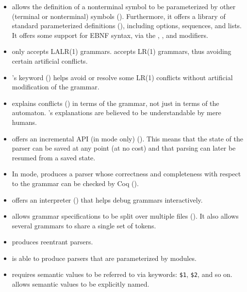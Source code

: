 \documentclass[onecolumn,11pt,nocopyrightspace,preprint]{sigplanconf}
\begin{document}
\begin{itemize}

\item \menhir allows the definition of a nonterminal symbol to be parameterized by other
      (terminal or nonterminal) symbols (). Furthermore, it offers a library of
      standard parameterized definitions (), including options,
      sequences, and lists. It offers some support for EBNF syntax,
      via the \dquestion, \dplus, and \dstar modifiers.

\item \ocamlyacc only accepts LALR(1) grammars. \menhir accepts LR(1) grammars,
      thus avoiding certain artificial conflicts.

\item \menhir's \dinline keyword () helps avoid or resolve some LR(1)
      conflicts without artificial modification of the grammar.

\item \menhir explains conflicts () in terms of the grammar,
      not just in terms of the automaton. \menhir's explanations are believed
      to be understandable by mere humans.

\item \menhir offers an incremental API (in \otable mode only) (). This
          means that the state of the parser can be saved at any point (at no
          cost) and that parsing can later be resumed from a saved state.

\item In \ocoq mode, \menhir produces a parser whose correctness and
  completeness with respect to the grammar can be checked by Coq ().

\item \menhir offers an interpreter () that helps debug
      grammars interactively.

\item \menhir allows grammar specifications to be split over multiple files ().
      It also allows several grammars to share a single set of tokens.

\item \menhir produces reentrant parsers.

\item \menhir is able to produce parsers that are parameterized by \ocaml
      modules.

\item \ocamlyacc requires semantic values to be referred to via keywords: \verb+$1+,
      \verb+$2+, and so on. \menhir allows semantic values to be explicitly named.


\end{itemize}
\end{document}
